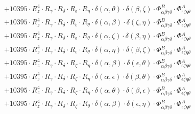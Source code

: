 \documentclass{article}
\begin{document}
\begin{equation}
\begin{array}{c}
 \\[0.2em] 		 + 10395 \cdot R_{z}^{4} \cdot R_{\gamma{}} \cdot R_{\delta{}} \cdot R_{\epsilon{}} \cdot R_{\eta{}} \cdot \delta{}\left(\alpha{}, \theta{}\right) \cdot \delta{}\left(\beta{}, \zeta{}\right) \cdot \Phi{}^{B}_{\alpha{}\beta{}\gamma{}\delta{}} \cdot \Phi{}^{A}_{\epsilon{}\zeta{}\eta{}\theta{}} 
 \\[0.2em] 		 + 10395 \cdot R_{z}^{4} \cdot R_{\gamma{}} \cdot R_{\delta{}} \cdot R_{\epsilon{}} \cdot R_{\theta{}} \cdot \delta{}\left(\alpha{}, \beta{}\right) \cdot \delta{}\left(\zeta{}, \eta{}\right) \cdot \Phi{}^{B}_{\alpha{}\beta{}\gamma{}\delta{}} \cdot \Phi{}^{A}_{\epsilon{}\zeta{}\eta{}\theta{}} 
 \\[0.2em] 		 + 10395 \cdot R_{z}^{4} \cdot R_{\gamma{}} \cdot R_{\delta{}} \cdot R_{\epsilon{}} \cdot R_{\theta{}} \cdot \delta{}\left(\alpha{}, \zeta{}\right) \cdot \delta{}\left(\beta{}, \eta{}\right) \cdot \Phi{}^{B}_{\alpha{}\beta{}\gamma{}\delta{}} \cdot \Phi{}^{A}_{\epsilon{}\zeta{}\eta{}\theta{}} 
 \\[0.2em] 		 + 10395 \cdot R_{z}^{4} \cdot R_{\gamma{}} \cdot R_{\delta{}} \cdot R_{\epsilon{}} \cdot R_{\theta{}} \cdot \delta{}\left(\alpha{}, \eta{}\right) \cdot \delta{}\left(\beta{}, \zeta{}\right) \cdot \Phi{}^{B}_{\alpha{}\beta{}\gamma{}\delta{}} \cdot \Phi{}^{A}_{\epsilon{}\zeta{}\eta{}\theta{}} 
 \\[0.2em] 		 + 10395 \cdot R_{z}^{4} \cdot R_{\gamma{}} \cdot R_{\delta{}} \cdot R_{\zeta{}} \cdot R_{\eta{}} \cdot \delta{}\left(\alpha{}, \beta{}\right) \cdot \delta{}\left(\epsilon{}, \theta{}\right) \cdot \Phi{}^{B}_{\alpha{}\beta{}\gamma{}\delta{}} \cdot \Phi{}^{A}_{\epsilon{}\zeta{}\eta{}\theta{}} 
 \\[0.2em] 		 + 10395 \cdot R_{z}^{4} \cdot R_{\gamma{}} \cdot R_{\delta{}} \cdot R_{\zeta{}} \cdot R_{\eta{}} \cdot \delta{}\left(\alpha{}, \epsilon{}\right) \cdot \delta{}\left(\beta{}, \theta{}\right) \cdot \Phi{}^{B}_{\alpha{}\beta{}\gamma{}\delta{}} \cdot \Phi{}^{A}_{\epsilon{}\zeta{}\eta{}\theta{}} 
 \\[0.2em] 		 + 10395 \cdot R_{z}^{4} \cdot R_{\gamma{}} \cdot R_{\delta{}} \cdot R_{\zeta{}} \cdot R_{\eta{}} \cdot \delta{}\left(\alpha{}, \theta{}\right) \cdot \delta{}\left(\beta{}, \epsilon{}\right) \cdot \Phi{}^{B}_{\alpha{}\beta{}\gamma{}\delta{}} \cdot \Phi{}^{A}_{\epsilon{}\zeta{}\eta{}\theta{}} 
 \\[0.2em] 		 + 10395 \cdot R_{z}^{4} \cdot R_{\gamma{}} \cdot R_{\delta{}} \cdot R_{\zeta{}} \cdot R_{\theta{}} \cdot \delta{}\left(\alpha{}, \beta{}\right) \cdot \delta{}\left(\epsilon{}, \eta{}\right) \cdot \Phi{}^{B}_{\alpha{}\beta{}\gamma{}\delta{}} \cdot \Phi{}^{A}_{\epsilon{}\zeta{}\eta{}\theta{}} 

\end{array}
\end{equation}
\end{document}
